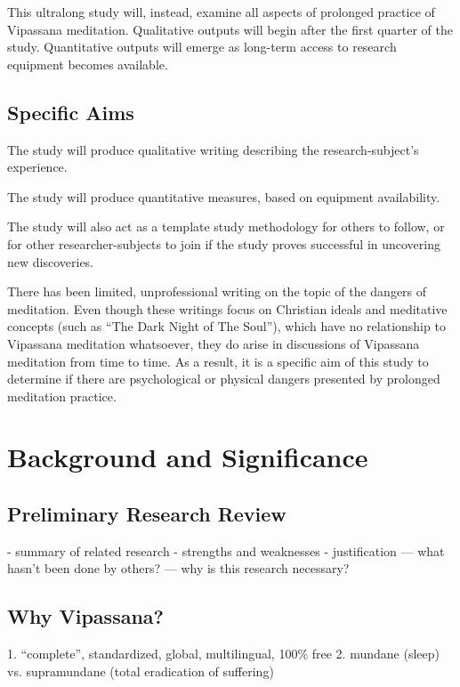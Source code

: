 \documentclass[a4paper, amsfonts, amssymb, amsmath, reprint, showkeys, nofootinbib, twoside]{revtex4-1}
\begin{document}
This ultralong study will, instead, examine all aspects of prolonged practice of
Vipassana meditation.
Qualitative outputs will begin after the first quarter of the study.
Quantitative outputs will emerge as long-term access to research equipment becomes available.

\subsection{Specific Aims}

The study will produce qualitative writing describing the research-subject's experience.

The study will produce quantitative measures, based on equipment availability.

The study will also act as a template study methodology for others to follow,
or for other researcher-subjects to join if the study proves successful in
uncovering new discoveries.

There has been limited, unprofessional writing on the topic of the dangers of meditation.
\cite{ingram2020mastering,https://doi.org/10.1080/03060497.1983.11084578}
Even though these writings focus on Christian ideals and meditative concepts
(such as ``The Dark Night of The Soul''),
which have no relationship to Vipassana meditation whatsoever,
they do arise in discussions of Vipassana meditation from time to time.
As a result, it is a specific aim of this study to determine if there are
psychological or physical dangers presented by prolonged meditation practice.

\section{Background and Significance}

\subsection{Preliminary Research Review}
- summary of related research
- strengths and weaknesses
- justification
--- what hasn't been done by others?
--- why is this research necessary?

\subsection{Why Vipassana?}

1. ``complete'', standardized, global, multilingual, 100\% free
2. mundane (sleep) vs. supramundane (total eradication of suffering)
\end{document}
